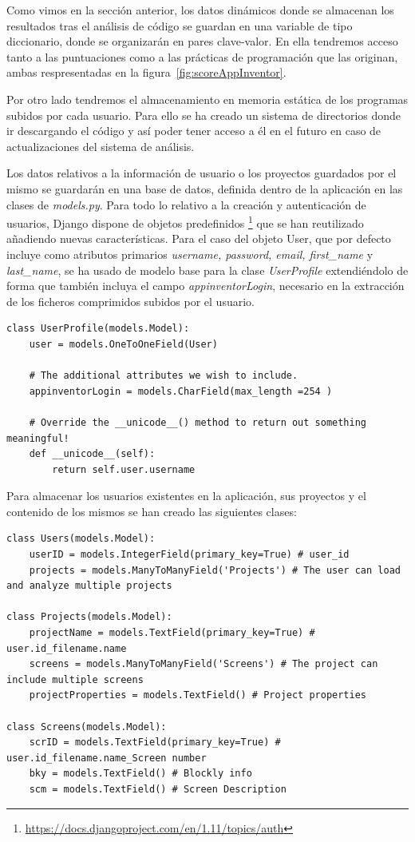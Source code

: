 \documentclass[a4paper, 12pt]{book}
\begin{document}
Como vimos en la sección anterior, los datos dinámicos donde se almacenan los resultados tras el análisis de código se guardan en una variable de tipo diccionario, donde se organizarán en pares clave-valor. En ella tendremos acceso tanto a las puntuaciones como a las prácticas de programación que las originan, ambas respresentadas en la figura~\ref{fig:scoreAppInventor}.

Por otro lado tendremos el almacenamiento en memoria estática de los programas subidos por cada usuario. Para ello se ha creado un sistema de directorios donde ir descargando el código y así poder tener acceso a él en el futuro en caso de actualizaciones del sistema de análisis. 

Los datos relativos a la información de usuario o los proyectos guardados por el mismo se guardarán en una base de datos, definida dentro de la aplicación en las clases de \textit{models.py}. Para todo lo relativo a la creación y autenticación de usuarios, Django dispone de objetos predefinidos \footnote{\url{https://docs.djangoproject.com/en/1.11/topics/auth}} que se han reutilizado añadiendo nuevas características. Para el caso del objeto User, que por defecto incluye como atributos primarios \textit{username, password, email, first\_name} y \textit{last\_name}, se ha usado de modelo base para la clase \textit{UserProfile} extendiéndolo de forma que también incluya el campo \textit{appinventorLogin}, necesario en la extracción de los ficheros comprimidos subidos por el usuario.
\begin{lstlisting}
class UserProfile(models.Model):
    user = models.OneToOneField(User)

    # The additional attributes we wish to include.
    appinventorLogin = models.CharField(max_length =254 )

    # Override the __unicode__() method to return out something meaningful!
    def __unicode__(self):
        return self.user.username    
\end{lstlisting}
Para almacenar los usuarios existentes en la aplicación, sus proyectos y el contenido de los mismos se han creado las siguientes clases: 
\begin{lstlisting}
class Users(models.Model):
    userID = models.IntegerField(primary_key=True) # user_id
    projects = models.ManyToManyField('Projects') # The user can load and analyze multiple projects

class Projects(models.Model):
    projectName = models.TextField(primary_key=True) # user.id_filename.name
    screens = models.ManyToManyField('Screens') # The project can include multiple screens
    projectProperties = models.TextField() # Project properties
    
class Screens(models.Model):
    scrID = models.TextField(primary_key=True) # user.id_filename.name_Screen number
    bky = models.TextField() # Blockly info
    scm = models.TextField() # Screen Description
\end{lstlisting} 
\end{document}
